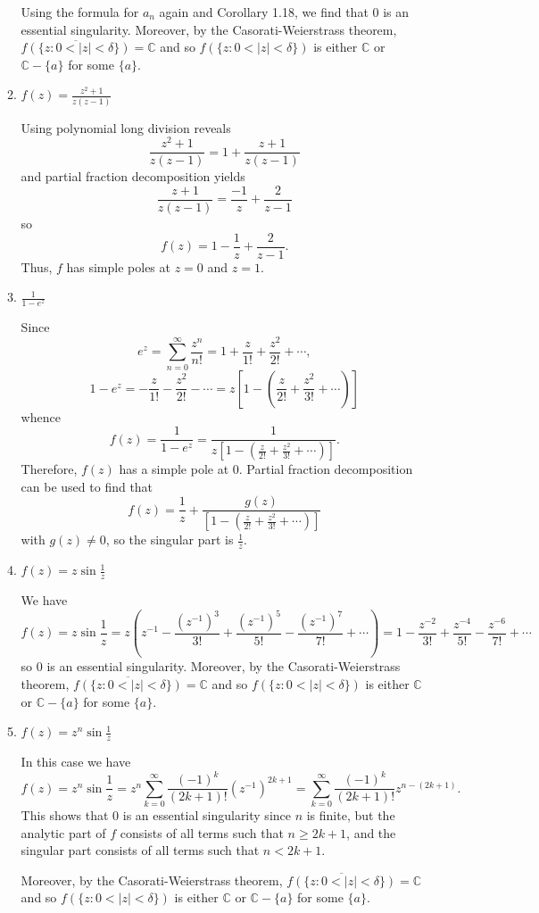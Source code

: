 \documentclass[11pt,oneside,english]{amsart}
\theoremstyle{definition}
\newcommand{\MB}[1]{\mathbb{#1}}
\begin{document}
\begin{enumerate}
\begin{enumerate}
Using the formula for $a_n$ again and Corollary 1.18, we find that 0 is an essential singularity. Moreover, by the Casorati-Weierstrass theorem, $\overline{f(\{z:0<|z|<\delta\})}=\MB{C}$ and so $f(\{z:0<|z|<\delta\})$ is either $\MB{C}$ or $\MB{C}-\{a\}$ for some $\{a\}$.


\item $\displaystyle f(z)=\frac{z^2+1}{z(z-1)}$

Using polynomial long division reveals
\[
\frac{z^2+1}{z(z-1)}=1+\frac{z+1}{z(z-1)}
\]
and partial fraction decomposition yields
\[
\frac{z+1}{z(z-1)}=\frac{-1}{z}+\frac{2}{z-1}
\]
so
\[
f(z)=1-\frac{1}{z}+\frac{2}{z-1}.
\]
Thus, $f$ has simple poles at $z=0$ and $z=1$.

\item $\displaystyle \frac{1}{1-e^z}$

Since
\[
e^z=\sum_{n=0}^\infty\frac{z^n}{n!}=1+\frac{z}{1!}+\frac{z^2}{2!}+\cdots,
\]
\[
1-e^z=-\frac{z}{1!}-\frac{z^2}{2!}-\cdots=z\left[1-\left(\frac{z}{2!}+\frac{z^2}{3!}+\cdots\right)\right]
\]
whence
\[
f(z)=\frac{1}{1-e^z}=\frac{1}{z\left[1-\left(\frac{z}{2!}+\frac{z^2}{3!}+\cdots\right)\right]}.
\]
Therefore, $f(z)$ has a simple pole at 0. Partial fraction decomposition can be used to find that
\[
f(z)=\frac{1}{z}+\frac{g(z)}{\left[1-\left(\frac{z}{2!}+\frac{z^2}{3!}+\cdots\right)\right]}
\]
with $g(z)\neq 0$, so the singular part is $\frac{1}{z}$.

\item $\displaystyle f(z)=z\sin\frac{1}{z}$

We have
\[
f(z)=z\sin\frac{1}{z}=z\left(z^{-1}-\frac{(z^{-1})^3}{3!}+\frac{(z^{-1})^5}{5!}-\frac{(z^{-1})^7}{7!}+\cdots\right)=1-\frac{z^{-2}}{3!}+\frac{z^{-4}}{5!}-\frac{z^{-6}}{7!}+\cdots
\]
so 0 is an essential singularity. Moreover, by the Casorati-Weierstrass theorem, $\overline{f(\{z:0<|z|<\delta\})}=\MB{C}$ and so $f(\{z:0<|z|<\delta\})$ is either $\MB{C}$ or $\MB{C}-\{a\}$ for some $\{a\}$.

\item $\displaystyle f(z)=z^n\sin\frac{1}{z}$

In this case we have
\[
f(z)=z^n\sin\frac{1}{z}=z^n\sum_{k=0}^\infty\frac{(-1)^k}{(2k+1)!}(z^{-1})^{2k+1}=\sum_{k=0}^\infty\frac{(-1)^k}{(2k+1)!}z^{n-(2k+1)}.
\]
This shows that 0 is an essential singularity since $n$ is finite, but the analytic part of $f$ consists of all terms such that $n\geq 2k+1$, and the singular part consists of all terms such that $n<2k+1$.

Moreover, by the Casorati-Weierstrass theorem, $\overline{f(\{z:0<|z|<\delta\})}=\MB{C}$ and so $f(\{z:0<|z|<\delta\})$ is either $\MB{C}$ or $\MB{C}-\{a\}$ for some $\{a\}$.
\end{enumerate}


\end{enumerate}
\end{document}
